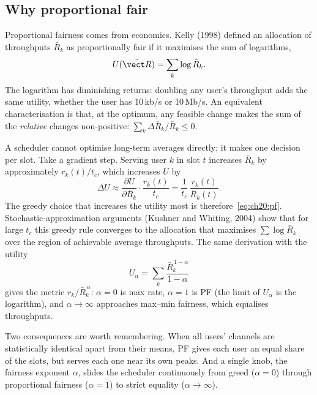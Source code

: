 \subsection{Why proportional fair}

Proportional fairness comes from economics. Kelly (1998) defined an allocation of throughputs $\bar R_k$ as
proportionally fair if it maximises the sum of logarithms,
\begin{equation}
U(\bar{\vect R})=\sum_k\log\bar R_k .
\end{equation}
The logarithm has diminishing returns: doubling any user's throughput adds the same utility, whether the user has
10\,kb/s or 10\,Mb/s. An equivalent characterisation is that, at the optimum, any feasible change makes the sum of the
\emph{relative} changes non-positive: $\sum_k\Delta\bar R_k/\bar R_k\le0$.

\begin{deeper}
A scheduler cannot optimise long-term averages directly; it makes one decision per slot. Take a gradient step. Serving
user $k$ in slot $t$ increases $\bar R_k$ by approximately $r_k(t)/t_c$, which increases $U$ by
\begin{equation}
\Delta U\approx\frac{\partial U}{\partial\bar R_k}\cdot\frac{r_k(t)}{t_c}=\frac{1}{t_c}\,\frac{r_k(t)}{\bar R_k(t)} .
\end{equation}
The greedy choice that increases the utility most is therefore~\eqref{eq:ch20:pf}. Stochastic-approximation arguments
(Kushner and Whiting, 2004) show that for large $t_c$ this greedy rule converges to the allocation that maximises
$\sum\log\bar R_k$ over the region of achievable average throughputs. The same derivation with the utility
\begin{equation}
U_\alpha=\sum_k\frac{\bar R_k^{\,1-\alpha}}{1-\alpha}
\end{equation}
gives the  metric $r_k/\bar R_k^{\,\alpha}$: $\alpha=0$ is max rate, $\alpha=1$ is PF (the limit of
$U_\alpha$ is the logarithm), and $\alpha\to\infty$ approaches max--min fairness, which equalises throughputs.
\end{deeper}

Two consequences are worth remembering. When all users' channels are statistically identical apart from their means,
PF gives each user an equal share of the slots, but serves each one near its own peaks. And a single knob, the
fairness exponent $\alpha$, slides the scheduler continuously from greed ($\alpha=0$) through proportional fairness
($\alpha=1$) to strict equality ($\alpha\to\infty$).

